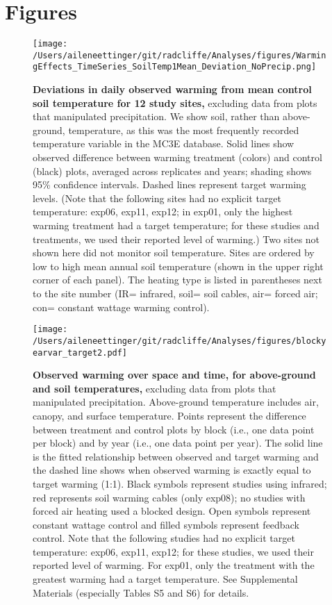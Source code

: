 \documentclass{article}
\begin{document}
\section* {Figures}
\clearpage
 \begin{figure}[h]
\centering
 \texttt{[image: /Users/aileneettinger/git/radcliffe/Analyses/figures/WarmingEffects\_TimeSeries\_SoilTemp1Mean\_Deviation\_NoPrecip.png]}
 \caption{\textbf{Deviations in daily observed warming from mean control soil temperature for 12 study sites,} excluding data from plots that manipulated precipitation. We show soil, rather than above-ground, temperature, as this was the most frequently recorded temperature variable in the MC3E database. Solid lines show observed difference between warming treatment (colors) and control (black) plots, averaged across replicates and years; shading shows 95\% confidence intervals. Dashed lines represent target warming levels. (Note that the following sites had no explicit target temperature: exp06, exp11, exp12; in exp01, only the highest warming treatment had a target temperature; for these studies and treatments, we used their reported level of warming.) Two sites not shown here did not monitor soil temperature. Sites are ordered by low to high mean annual soil temperature (shown in the upper right corner of each panel). The heating type is listed in parentheses next to the site number (IR= infrared, soil= soil cables, air= forced air; con= constant wattage warming control). } %
 \label{fig:effwarm}
 \end{figure}
 \begin{figure}[p]
 \centering
 \texttt{[image: /Users/aileneettinger/git/radcliffe/Analyses/figures/blockyearvar\_target2.pdf]} 
 \caption{\textbf{Observed warming over space and time, for above-ground and soil temperatures,} excluding data from plots that manipulated precipitation. Above-ground temperature includes air, canopy, and surface temperature. Points represent the difference between treatment and control plots by block (i.e., one data point per block) and by year (i.e., one data point per year). The solid line is the fitted relationship between observed and target warming and the dashed line shows when observed warming is exactly equal to target warming (1:1). Black symbols represent studies using infrared; red represents soil warming cables (only exp08); no studies with forced air heating used a blocked design. Open symbols represent constant wattage control and filled symbols represent feedback control. Note that the following studies had no explicit target temperature: exp06, exp11, exp12; for these studies, we used their reported level of warming. For exp01, only the treatment with the greatest warming had a target temperature. See Supplemental Materials (especially Tables S5 and S6) for details.}
 \label{fig:blockyear}
 \end{figure}
\end{document}
